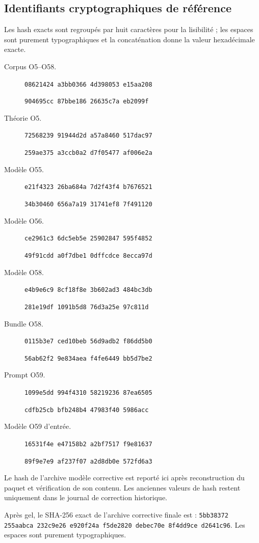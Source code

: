 \documentclass[11pt,a4paper]{article}
\begin{document}
\subsection{Identifiants cryptographiques de référence}
Les hash exacts sont regroupés par huit caractères pour la lisibilité ; les espaces sont purement typographiques et la concaténation donne la valeur hexadécimale exacte.

\begin{description}
\item[Corpus O5--O58.] {\scriptsize\texttt{08621424 a3bb0366 4d398053 e15aa208}\par\texttt{904695cc 87bbe186 26635c7a eb2099f}}
\item[Théorie O5.] {\scriptsize\texttt{72568239 91944d2d a57a8460 517dac97}\par\texttt{259ae375 a3ccb0a2 d7f05477 af006e2a}}
\item[Modèle O55.] {\scriptsize\texttt{e21f4323 26ba684a 7d2f43f4 b7676521}\par\texttt{34b30460 656a7a19 31741ef8 7f491120}}
\item[Modèle O56.] {\scriptsize\texttt{ce2961c3 6dc5eb5e 25902847 595f4852}\par\texttt{49f91cdd a0f7dbe1 0dffcdce 8ecca97d}}
\item[Modèle O58.] {\scriptsize\texttt{e4b9e6c9 8cf18f8e 3b602ad3 484bc3db}\par\texttt{281e19df 1091b5d8 76d3a25e 97c811d}}
\item[Bundle O58.] {\scriptsize\texttt{0115b3e7 ced10beb 56d9adb2 f86dd5b0}\par\texttt{56ab62f2 9e834aea f4fe6449 bb5d7be2}}
\item[Prompt O59.] {\scriptsize\texttt{1099e5dd 994f4310 58219236 87ea6505}\par\texttt{cdfb25cb bfb248b4 47983f40 5986acc}}
\item[Modèle O59 d'entrée.] {\scriptsize\texttt{16531f4e e47158b2 a2bf7517 f9e81637}\par\texttt{89f9e7e9 af237f07 a2d8db0e 572fd6a3}}
\end{description}

Le hash de l'archive modèle corrective est reporté ici après reconstruction du paquet et vérification de son contenu. Les anciennes valeurs de hash restent uniquement dans le journal de correction historique.

Après gel, le SHA-256 exact de l'archive corrective finale est : {\scriptsize\texttt{5bb38372 255aabca 232c9e26 e920f24a f5de2820 debec70e 8f4dd9ce d2641c96}}. Les espaces sont purement typographiques.
\end{document}
